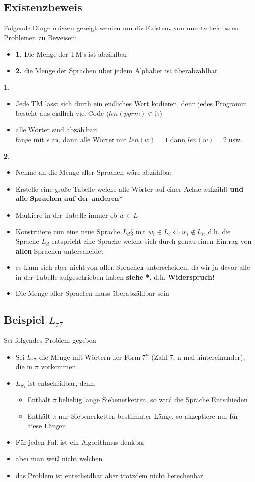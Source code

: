 \documentclass[12pt,a4paper]{article}
\begin{document}
\subsection{Existenzbeweis}
Folgende Dinge müssen gezeigt werden um die Existenz von unentscheidbaren Problemen zu Beweisen:
\begin{itemize}
\item \textbf{1.} Die Menge der TM's ist abzählbar
\item \textbf{2.} die Menge der Sprachen über jedem Alphabet ist überabzählbar
\end{itemize}
\textbf{1.}
\begin{itemize}
\item Jede TM lässt sich durch ein endliches Wort kodieren, denn jedes Programm besteht aus endlich viel Code ($len(pgrm)\in \mathbb{N}$)
\item alle Wörter sind abzählbar:\\ fange mit $\epsilon$ an, dann alle Wörter mit $len(w) = 1$ dann $len(w) = 2$ usw.
\end{itemize}
\textbf{2.}
\begin{itemize}
\item Nehme an die Menge aller Sprachen wäre abzählbar
\item Erstelle eine große Tabelle welche alle Wörter auf einer Achse aufzählt \textbf{und alle Sprachen auf der anderen*}
\item Markiere in der Tabelle immer ob $w \in L$
\item Konstruiere nun eine neue Sprache $L_d§$ mit $w_i \in L_d \Leftrightarrow w_i \not\in L_i$, d.h. die Sprache $L_d$ entspricht eine Sprache welche sich durch genau einen Eintrag von \textbf{allen} Sprachen unterscheidet
\item es kann sich aber nicht von allen Sprachen unterscheiden, da wir ja davor alle in der Tabelle aufgeschrieben haben \textbf{siehe *}, d.h. \textbf{Widerspruch!}
\item Die Menge aller Sprachen muss überabzählbar sein
\end{itemize}
\subsection{Beispiel $L_{\pi 7}$}
Sei folgendes Problem gegeben
\begin{itemize}
\item Sei $L_{\pi 7}$ die Menge mit Wörtern der Form $7^n$ (Zahl 7, n-mal hintereinander), die in $\pi$ vorkommen 
\item $L_{\pi 7}$ ist entscheidbar, denn:
\begin{itemize}
\item Enthält $\pi$ beliebig lange Siebenerketten, so wird die Sprache Entschieden
\item Enthält $\pi$ nur Siebenerketten bestimmter Länge, so akzeptiere nur für diese Längen
\end{itemize}
\item Für jeden Fall ist ein Algorithmus denkbar
\item aber man weiß nicht welchen
\item das Problem ist entscheidbar aber trotzdem nicht berechenbar
\end{itemize}
\end{document}
